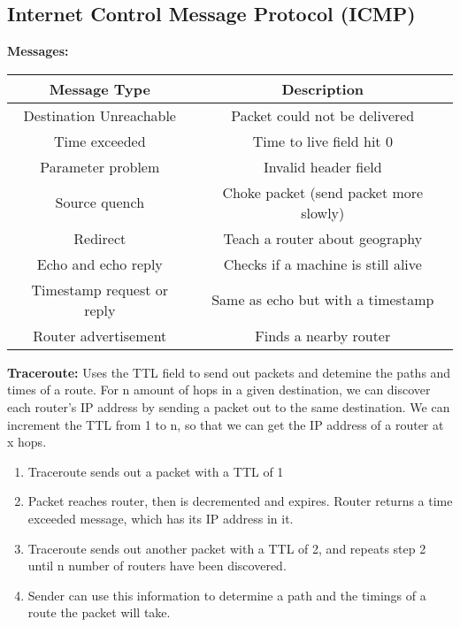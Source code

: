 \documentclass[a4paper,10pt]{article}
\begin{document}
\subsection{Internet Control Message Protocol (ICMP)}
\textcolor{RubineRed}{\textbf{Messages:}}
\begin{center}
	\begin{tabular}{|c|c|}
		\hline 
		\textbf{Message Type} &\textbf{Description} \\
		\hline 
		\hline
		Destination Unreachable &Packet could not be delivered \\
		\hline 
		Time exceeded &Time to live field hit 0 \\
		\hline 
		Parameter problem &Invalid header field \\ 
		\hline 
		Source quench &Choke packet (send packet more slowly) \\
		\hline 
		Redirect &Teach a router about geography \\
		\hline 
		Echo and echo reply &Checks if a machine is still alive \\
		\hline 
		Timestamp request or reply &Same as echo but with a timestamp \\
		\hline 
		Router advertisement &Finds a nearby router \\
		\hline
	\end{tabular}
\end{center}
\textcolor{RubineRed}{\textbf{Traceroute:}} Uses the TTL field to send out packets and detemine the paths and times of a route. For n amount of hops in a given destination, we can discover each router's IP address by sending a packet out to the same destination. We can increment the TTL from 1 to n, so that we can get the IP address of a router at x hops. 
\begin{enumerate}
	\item Traceroute sends out a packet with a TTL of 1
	\item Packet reaches router, then is decremented and expires. Router returns a time exceeded message, which has its IP address in it. 
	\item Traceroute sends out another packet with a TTL of 2, and repeats step 2 until n number of routers have been discovered. 
	\item Sender can use this information to determine a path and the timings of a route the packet will take. 
\end{enumerate}
\end{document}
